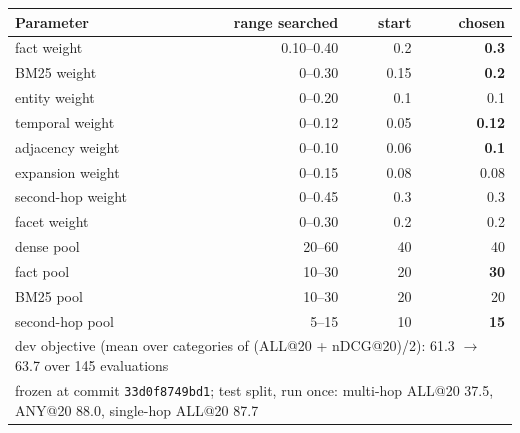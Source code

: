 \begin{tabular}{lrrr}
\toprule
Parameter & range searched & start & chosen \\
\midrule
fact weight & 0.10–0.40 & 0.2 & \textbf{0.3} \\
BM25 weight & 0–0.30 & 0.15 & \textbf{0.2} \\
entity weight & 0–0.20 & 0.1 & 0.1 \\
temporal weight & 0–0.12 & 0.05 & \textbf{0.12} \\
adjacency weight & 0–0.10 & 0.06 & \textbf{0.1} \\
expansion weight & 0–0.15 & 0.08 & 0.08 \\
second-hop weight & 0–0.45 & 0.3 & 0.3 \\
facet weight & 0–0.30 & 0.2 & 0.2 \\
dense pool & 20–60 & 40 & 40 \\
fact pool & 10–30 & 20 & \textbf{30} \\
BM25 pool & 10–30 & 20 & 20 \\
second-hop pool & 5–15 & 10 & \textbf{15} \\
\midrule
\multicolumn{4}{l}{dev objective (mean over categories of (ALL@20 + nDCG@20)/2): 61.3 $\rightarrow$ 63.7 over 145 evaluations} \\
\multicolumn{4}{l}{frozen at commit \texttt{33d0f8749bd1}; test split, run once: multi-hop ALL@20 37.5, ANY@20 88.0, single-hop ALL@20 87.7} \\
\bottomrule
\end{tabular}
